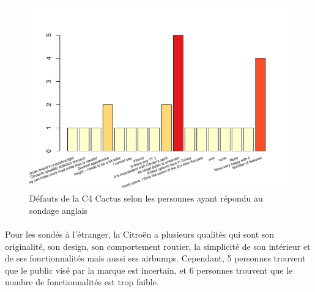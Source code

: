 \documentclass[12pt]{article}\usepackage[]{graphicx}\usepackage[]{color}
\makeatletter
\def\maxwidth{ %
  \ifdim\Gin@nat@width>\linewidth
    \linewidth
  \else
    \Gin@nat@width
  \fi
}
\newenvironment{knitrout}{}{} %
\makeatother
\begin{document}
\begin{knitrout}
\color{fgcolor}\begin{figure}[H]
\includegraphics[width=\maxwidth]{figure/flaws_en-1} \caption[Défauts de la C4 Cactus selon les personnes ayant répondu au sondage anglais]{Défauts de la C4 Cactus selon les personnes ayant répondu au sondage anglais}\label{fig:flaws en}
\end{figure}


\end{knitrout}

\paragraph{} Pour les sondés à l'étranger, la
Citroën a plusieurs qualités qui sont son originalité, son design, son
comportement routier, la simplicité de son intérieur et de ses fonctionnalités
mais aussi ses airbumps. Cependant, 5 personnes trouvent que le public visé par
la marque est incertain, et 6 personnes trouvent que le nombre de
fonctionnalités est trop faible.
\end{document}

